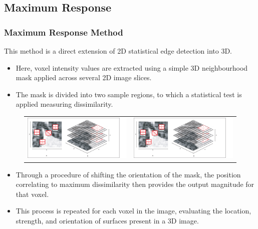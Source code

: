 \documentclass[9pt]{beamer}
\begin{document}
 \subsection{Maximum Response}
 \begin{frame}
\frametitle{ Maximum Response Method}
This method is a direct extension of 2D statistical edge detection into 3D.\\
\begin{itemize}
\item Here, voxel intensity values are extracted using a simple 3D neighbourhood mask applied across several 2D image slices. 
\item The mask is divided into two sample regions, to which a statistical test is applied measuring dissimilarity.
 \end{itemize}
 \begin{figure}
 \begin{tabular}{c c}
 \includegraphics[scale=0.25]{2D3Dmasks1}& \includegraphics[scale=0.25]{2D3Dmasks2}
 \end{tabular}
 \end{figure}
 \begin{itemize}
 \item Through a procedure of shifting the orientation of the mask, the position correlating to maximum dissimilarity then provides the output magnitude for that voxel.
 \item This process is repeated for each voxel in the image, evaluating the location, strength, and orientation of surfaces present in a 3D image.
 \end{itemize}
 \end{frame}
\end{document}
